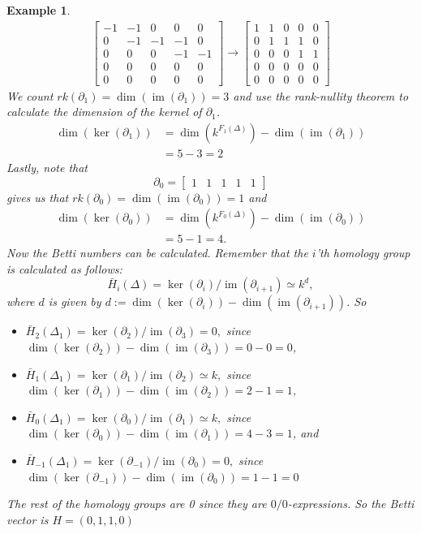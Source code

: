 \documentclass[11pt,a4paper,twoside, openright]{report}
\newtheorem{myex}[mythm]{Example}
\DeclareMathOperator{\im}{im}
\begin{document}
\begin{myex}
\begin{align*}
\begin{bmatrix}
-1 & -1 & 0 & 0 & 0\\
0 & -1 & -1 & -1 & 0\\
0 & 0 & 0 & -1 & -1\\
0 & 0 & 0 & 0 & 0\\
0 & 0 & 0 & 0 & 0
\end{bmatrix}
\to
\begin{bmatrix}
1 & 1 & 0 & 0 & 0\\
0 & 1 & 1 & 1 & 0\\
0 & 0 & 0 & 1 & 1\\
0 & 0 & 0 & 0 & 0\\
0 & 0 & 0 & 0 & 0
\end{bmatrix}
\end{align*}
We count $rk(\partial_1)=\dim(\im(\partial_1))=3$ and use the rank-nullity theorem to calculate the dimension of the kernel of $\partial_1$.
\begin{align*}
\dim(\ker(\partial_1))&=\dim(k^{F_1(\Delta)})-\dim(\im(\partial_1))\\
&=5-3= 2
\end{align*}
Lastly, note that 
\begin{equation*}
\partial_0=
\begin{bmatrix}
1 & 1 & 1 & 1 & 1 
\end{bmatrix}
\end{equation*}
gives us that $rk(\partial_0)=\dim(\im(\partial_0))=1$ and 
\begin{align*}
\dim(\ker(\partial_0))&=\dim(k^{F_0(\Delta)})-\dim(\im(\partial_0))\\
&=5-1= 4.
\end{align*}
Now the Betti numbers can be calculated. Remember that the $i$'th homology group is calculated as follows:
\begin{equation*}
\bar{H}_i(\Delta)=\ker(\partial_i)/\im (\partial_{i+1})\simeq k^d,
\end{equation*}
where $d$ is given by $d:=\dim(\ker(\partial_i))-\dim(\im(\partial_{i+1}))$. So 
\begin{itemize}
\item$\bar{H}_2(\Delta_1)=\ker(\partial_2)/\im(\partial_{3})=0,$
since $\dim(\ker(\partial_2))-\dim(\im(\partial_{3}))=0-0=0$,
\item$\bar{H}_1(\Delta_1)=\ker(\partial_1)/\im(\partial_{2})\simeq k,$ since $\dim(\ker(\partial_1))-\dim(\im(\partial_{2}))=2-1=1$,
\item$\bar{H}_0(\Delta_1)=\ker(\partial_0)/\im(\partial_{1})\simeq k,$
since $\dim(\ker(\partial_0))-\dim(\im(\partial_{1}))=4-3=1$, and 
\item$\bar{H}_{-1}(\Delta_1)=\ker(\partial_{-1})/\im(\partial_{0})=0,$
since $\dim(\ker(\partial_{-1}))-\dim(\im(\partial_{0}))=1-1=0$
\end{itemize}
The rest of the homology groups are 0 since they are $0/0$-expressions.
So the Betti vector is $H=(0,1,1,0)$
\end{myex}
\end{document}
